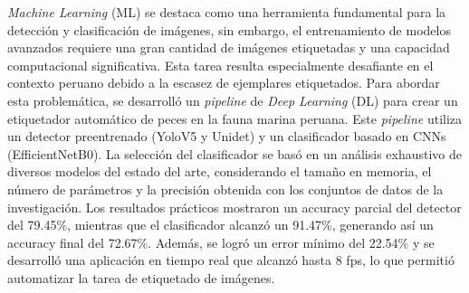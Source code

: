 \textit{Machine Learning} (ML) se destaca como una herramienta 
fundamental para la detección y clasificación de imágenes, 
sin embargo, el entrenamiento de modelos avanzados requiere 
una gran cantidad de imágenes etiquetadas y una capacidad 
computacional significativa. Esta tarea resulta especialmente 
desafiante en el contexto peruano debido a la escasez de 
ejemplares etiquetados. Para abordar esta problemática, se 
desarrolló un \textit{pipeline} de \textit{Deep Learning} (DL) para crear un 
etiquetador automático de peces en la fauna marina peruana. 
Este \textit{pipeline} utiliza un detector preentrenado (YoloV5 y Unidet) 
y un clasificador basado en CNNs (EfficientNetB0). La selección 
del clasificador se basó en un análisis exhaustivo de diversos 
modelos del estado del arte, considerando el tamaño en memoria, 
el número de parámetros y la precisión obtenida con los conjuntos 
de datos de la investigación. Los resultados prácticos mostraron 
un accuracy parcial del detector del 79.45\%, mientras que el 
clasificador alcanzó un 91.47\%, generando así un accuracy final 
del 72.67\%. Además, se logró un error mínimo del 22.54\% y se 
desarrolló una aplicación en tiempo real que alcanzó hasta 8 fps, 
lo que permitió automatizar la tarea de etiquetado de imágenes.